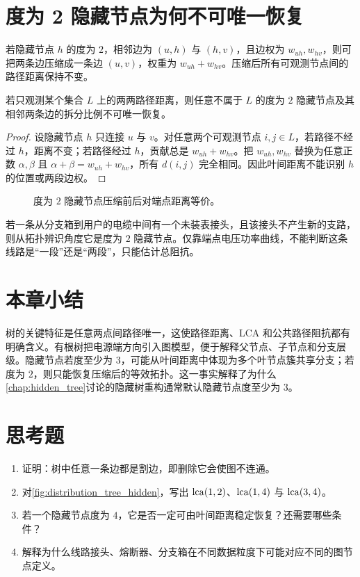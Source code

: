 \section{度为 2 隐藏节点为何不可唯一恢复}

\begin{definition}[度为 2 隐藏节点压缩]
若隐藏节点 $h$ 的度为 $2$，相邻边为 $(u,h)$ 与 $(h,v)$，且边权为 $w_{uh},w_{hv}$，则可把两条边压缩成一条边 $(u,v)$，权重为 $w_{uh}+w_{hv}$。压缩后所有可观测节点间的路径距离保持不变。
\end{definition}

\begin{proposition}[度为 2 隐藏节点不可由叶间距离唯一辨识]
\label{prop:degree2_unidentifiable}
若只观测某个集合 $L$ 上的两两路径距离，则任意不属于 $L$ 的度为 $2$ 隐藏节点及其相邻两条边的拆分比例不可唯一恢复。
\end{proposition}

\begin{proof}
设隐藏节点 $h$ 只连接 $u$ 与 $v$。对任意两个可观测节点 $i,j\in L$，若路径不经过 $h$，距离不变；若路径经过 $h$，贡献总是 $w_{uh}+w_{hv}$。把 $w_{uh},w_{hv}$ 替换为任意正数 $\alpha,\beta$ 且 $\alpha+\beta=w_{uh}+w_{hv}$，所有 $d(i,j)$ 完全相同。因此叶间距离不能识别 $h$ 的位置或两段边权。
\end{proof}

\begin{figure}[htbp]
  \centering
  
  \caption{度为 $2$ 隐藏节点压缩前后对端点距离等价。}
  \label{fig:degree2_hidden}
\end{figure}

\begin{example}[线路中点是否为节点]
若一条从分支箱到用户的电缆中间有一个未装表接头，且该接头不产生新的支路，则从拓扑辨识角度它是度为 $2$ 隐藏节点。仅靠端点电压功率曲线，不能判断这条线路是“一段”还是“两段”，只能估计总阻抗。
\end{example}

\section{本章小结}

树的关键特征是任意两点间路径唯一，这使路径距离、LCA 和公共路径阻抗都有明确含义。有根树把电源端方向引入图模型，便于解释父节点、子节点和分支层级。隐藏节点若度至少为 $3$，可能从叶间距离中体现为多个叶节点簇共享分支；若度为 $2$，则只能恢复压缩后的等效拓扑。这一事实解释了为什么\cref{chap:hidden_tree}讨论的隐藏树重构通常默认隐藏节点度至少为 $3$。

\section*{思考题}
\begin{enumerate}
  \item 证明：树中任意一条边都是割边，即删除它会使图不连通。
  \item 对\cref{fig:distribution_tree_hidden}，写出 $\operatorname{lca}(1,2)$、$\operatorname{lca}(1,4)$ 与 $\operatorname{lca}(3,4)$。
  \item 若一个隐藏节点度为 $4$，它是否一定可由叶间距离稳定恢复？还需要哪些条件？
  \item 解释为什么线路接头、熔断器、分支箱在不同数据粒度下可能对应不同的图节点定义。
\end{enumerate}
